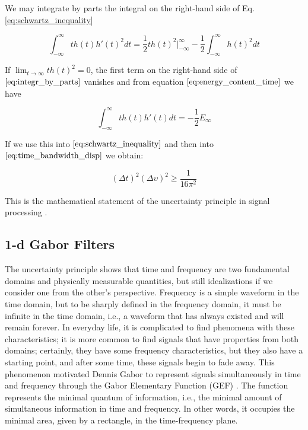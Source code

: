 We may integrate by parts the integral on the right-hand side of Eq. \eqref{eq:schwartz_inequality}

\begin{equation}\label{eq:integr_by_parts}
    \int_{-\infty}^{\infty}t h(t) h'(t)^2 dt =  \frac{1}{2}t h(t)^2 \biggr\rvert_{-\infty}^{\infty} - \frac{1}{2} \int_{-\infty}^{\infty}h(t)^2 dt
\end{equation}

If $\lim_{t\rightarrow \infty} t h(t)^2=0$, the first term on the right-hand side of $\eqref{eq:integr_by_parts}$ vanishes and from equation $\eqref{eq:energy_content_time}$ we have

\begin{equation}\label{eq:energy_content_developped}
    \int_{-\infty}^{\infty} t h(t)h'(t) dt = -\frac{1}{2} E_{\infty}
\end{equation}

If we use this into $\eqref{eq:schwartz_inequality}$ and then into $\eqref{eq:time_bandwidth_disp}$ we obtain:

\begin{equation}\label{eq:uncertainty_principle_freq_square}
   (\Delta t)^2(\Delta \upsilon)^2 \geq \frac{1}{16\pi^{2}} 
\end{equation}

This is the mathematical statement of the uncertainty principle in signal processing \citep{Petrou.Sevilla:Book:2006}.

\subsection{1-d Gabor Filters}
The uncertainty principle shows that time and frequency are two fundamental domains and physically measurable quantities, but still idealizations if we consider one from the other's perspective. Frequency is a simple waveform in the time domain, but to be sharply defined in the frequency domain, it must be infinite in the time domain, i.e., a waveform that has always existed and will remain forever. In everyday life, it is complicated to find phenomena with these characteristics; it is more common to find signals that have properties from both domains; certainly, they have some frequency characteristics, but they also have a starting point, and after some time, these signals begin to fade away. This phenomenon motivated Dennis Gabor to represent signals simultaneously in time and frequency through the Gabor Elementary Function (GEF) \citep{Gabor:JIEE:1946}. The function represents the minimal quantum of information, i.e., the minimal amount of simultaneous information in time and frequency. In other words, it occupies the minimal area, given by a rectangle, in the time-frequency plane.  


